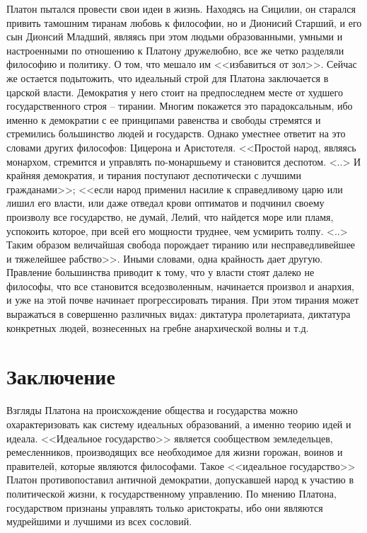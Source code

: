 	Платон пытался провести свои идеи в жизнь. Находясь на Сицилии, он 
	старался привить тамошним тиранам любовь к философии, но и Дионисий 
	Старший, и его сын Дионсий Младший, являясь при этом людьми 
	образованными, умными и настроенными по отношению к Платону 
	дружелюбно, все же четко разделяли философию и политику. О том, 
	что мешало им <<избавиться от зол>>. Сейчас же остается подытожить, 
	что идеальный строй для Платона заключается в царской власти. Демократия у 
	него стоит на предпоследнем месте от худшего государственного 
	строя -- тирании. Многим покажется это парадоксальным, ибо именно к 
	демократии с ее принципами равенства и свободы стремятся и стремились 
	большинство людей и государств. Однако уместнее ответит на это словами 
	других философов: Цицерона и Аристотеля. <<Простой народ, являясь монархом, 
	стремится и управлять по-монаршьему и становится деспотом. <..> 
	И крайняя демократия, и тирания поступают деспотически с лучшими 
	гражданами>>; <<если народ применил насилие к справедливому царю или 
	лишил его власти, или даже отведал крови оптиматов и подчинил своему 
	произволу все государство, не думай, Лелий, что найдется море или пламя, 
	успокоить которое, при всей его мощности труднее, чем усмирить толпу. <..> 
	Таким образом величайшая свобода порождает тиранию или несправедливейшее 
	и тяжелейшее рабство>>. Иными словами, одна крайность дает другую. 
	Правление большинства приводит к тому, что у власти стоят далеко не 
	философы, что все становится вседозволенным, начинается произвол и 
	анархия, и уже на этой почве начинает прогрессировать тирания. 
	При этом тирания может выражаться в совершенно различных видах: 
	диктатура пролетариата, диктатура конкретных людей, вознесенных на 
	гребне анархической волны и т.д.

\pagebreak
\chapter{Заключение}

	Взгляды Платона на происхождение общества и государства можно 
	охарактеризовать как систему идеальных образований, а именно теорию 
	идей и идеала. <<Идеальное государство>> является сообществом земледельцев, 
	ремесленников, производящих все необходимое для жизни горожан, воинов и 
	правителей, которые являются философами. Такое <<идеальное государство>> 
	Платон противопоставил античной демократии, допускавшей народ к участию 
	в политической жизни, к государственному управлению. По мнению Платона, 
	государством признаны управлять только аристократы, ибо они являются 
	мудрейшими и лучшими из всех сословий.

